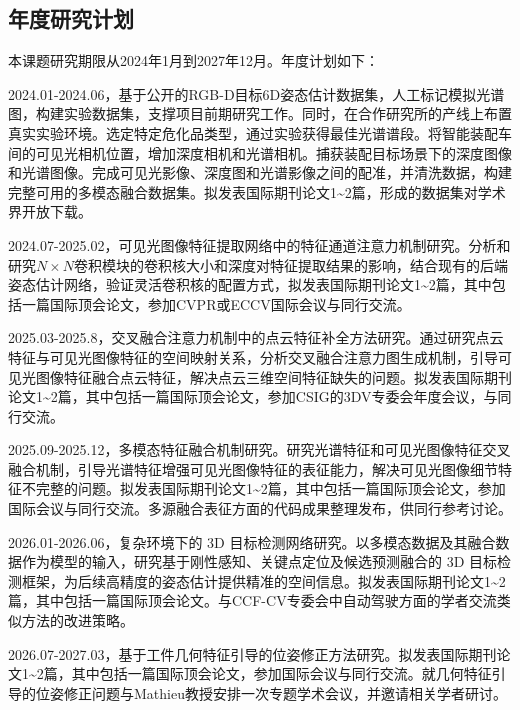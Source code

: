 \documentclass[12pt]{article}
\begin{document}

\subsection{年度研究计划}

本课题研究期限从2024年1月到2027年12月。年度计划如下：  

2024.01-2024.06，基于公开的RGB-D目标6D姿态估计数据集，人工标记模拟光谱图，构建实验数据集，支撑项目前期研究工作。同时，在合作研究所的产线上布置真实实验环境。选定特定危化品类型，通过实验获得最佳光谱谱段。将智能装配车间的可见光相机位置，增加深度相机和光谱相机。捕获装配目标场景下的深度图像和光谱图像。完成可见光影像、深度图和光谱影像之间的配准，并清洗数据，构建完整可用的多模态融合数据集。拟发表国际期刊论文1\textasciitilde2篇，形成的数据集对学术界开放下载。

2024.07-2025.02，可见光图像特征提取网络中的特征通道注意力机制研究。分析和研究$N\times N$卷积模块的卷积核大小和深度对特征提取结果的影响，结合现有的后端姿态估计网络，验证灵活卷积核的配置方式，拟发表国际期刊论文1\textasciitilde2篇，其中包括一篇国际顶会论文，参加CVPR或ECCV国际会议与同行交流。

2025.03-2025.8，交叉融合注意力机制中的点云特征补全方法研究。通过研究点云特征与可见光图像特征的空间映射关系，分析交叉融合注意力图生成机制，引导可见光图像特征融合点云特征，解决点云三维空间特征缺失的问题。拟发表国际期刊论文1\textasciitilde2篇，其中包括一篇国际顶会论文，参加CSIG的3DV专委会年度会议，与同行交流。

2025.09-2025.12，多模态特征融合机制研究。研究光谱特征和可见光图像特征交叉融合机制，引导光谱特征增强可见光图像特征的表征能力，解决可见光图像细节特征不完整的问题。拟发表国际期刊论文1\textasciitilde2篇，其中包括一篇国际顶会论文，参加国际会议与同行交流。多源融合表征方面的代码成果整理发布，供同行参考讨论。

2026.01-2026.06，复杂环境下的 3D 目标检测网络研究。以多模态数据及其融合数据作为模型的输入，研究基于刚性感知、关键点定位及候选预测融合的 3D 目标检测框架，为后续高精度的姿态估计提供精准的空间信息。拟发表国际期刊论文1\textasciitilde2篇，其中包括一篇国际顶会论文。与CCF-CV专委会中自动驾驶方面的学者交流类似方法的改进策略。

2026.07-2027.03，基于工件几何特征引导的位姿修正方法研究。拟发表国际期刊论文1\textasciitilde2篇，其中包括一篇国际顶会论文，参加国际会议与同行交流。就几何特征引导的位姿修正问题与Mathieu教授安排一次专题学术会议，并邀请相关学者研讨。
\end{document}
